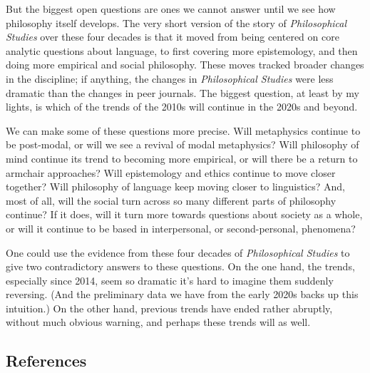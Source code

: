\documentclass[
  10pt,
  letterpaper,
  DIV=11,
  numbers=noendperiod,
  twoside]{scrartcl}
\begin{document}
But the biggest open questions are ones we cannot answer until we see
how philosophy itself develops. The very short version of the story of
\emph{Philosophical Studies} over these four decades is that it moved
from being centered on core analytic questions about language, to first
covering more epistemology, and then doing more empirical and social
philosophy. These moves tracked broader changes in the discipline; if
anything, the changes in \emph{Philosophical Studies} were less dramatic
than the changes in peer journals. The biggest question, at least by my
lights, is which of the trends of the 2010s will continue in the 2020s
and beyond.

We can make some of these questions more precise. Will metaphysics
continue to be post-modal, or will we see a revival of modal
metaphysics? Will philosophy of mind continue its trend to becoming more
empirical, or will there be a return to armchair approaches? Will
epistemology and ethics continue to move closer together? Will
philosophy of language keep moving closer to linguistics? And, most of
all, will the social turn across so many different parts of philosophy
continue? If it does, will it turn more towards questions about society
as a whole, or will it continue to be based in interpersonal, or
second-personal, phenomena?

One could use the evidence from these four decades of
\emph{Philosophical Studies} to give two contradictory answers to these
questions. On the one hand, the trends, especially since 2014, seem so
dramatic it's hard to imagine them suddenly reversing. (And the
preliminary data we have from the early 2020s backs up this intuition.)
On the other hand, previous trends have ended rather abruptly, without
much obvious warning, and perhaps these trends will as well.

\subsection*{References}\label{references}
\end{document}
